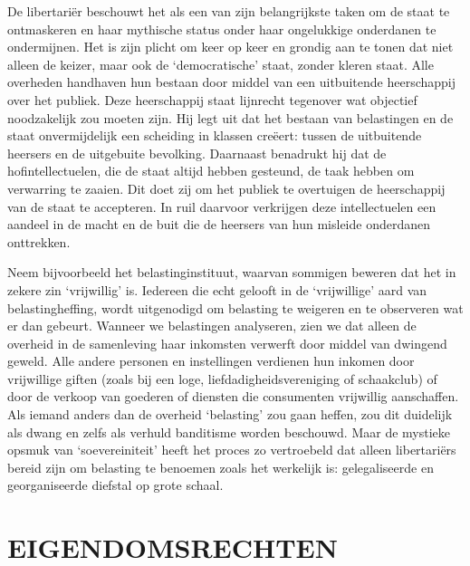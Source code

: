 \documentclass[
  a5paper,
  smalldemyvopaper,10pt,twoside,onecolumn,openright,extrafontsizes,hidelinks]{memoir}
\begin{document}
De libertariër beschouwt het als een van zijn belangrijkste taken om de
staat te ontmaskeren en haar mythische status onder haar ongelukkige
onderdanen te ondermijnen. Het is zijn plicht om keer op keer en grondig
aan te tonen dat niet alleen de keizer, maar ook de `democratische'
staat, zonder kleren staat. Alle overheden handhaven hun bestaan door
middel van een uitbuitende heerschappij over het publiek. Deze
heerschappij staat lijnrecht tegenover wat objectief noodzakelijk zou
moeten zijn. Hij legt uit dat het bestaan van belastingen en de staat
onvermijdelijk een scheiding in klassen creëert: tussen de uitbuitende
heersers en de uitgebuite bevolking. Daarnaast benadrukt hij dat de
hofintellectuelen, die de staat altijd hebben gesteund, de taak hebben
om verwarring te zaaien. Dit doet zij om het publiek te overtuigen de
heerschappij van de staat te accepteren. In ruil daarvoor verkrijgen
deze intellectuelen een aandeel in de macht en de buit die de heersers
van hun misleide onderdanen onttrekken.

Neem bijvoorbeeld het belastinginstituut, waarvan sommigen beweren dat
het in zekere zin `vrijwillig' is. Iedereen die echt gelooft in de
`vrijwillige' aard van belastingheffing, wordt uitgenodigd om belasting
te weigeren en te observeren wat er dan gebeurt. Wanneer we belastingen
analyseren, zien we dat alleen de overheid in de samenleving haar
inkomsten verwerft door middel van dwingend geweld. Alle andere personen
en instellingen verdienen hun inkomen door vrijwillige giften (zoals bij
een loge, liefdadigheidsvereniging of schaakclub) of door de verkoop van
goederen of diensten die consumenten vrijwillig aanschaffen. Als iemand
anders dan de overheid `belasting' zou gaan heffen, zou dit duidelijk
als dwang en zelfs als verhuld banditisme worden beschouwd. Maar de
mystieke opsmuk van `soevereiniteit' heeft het proces zo vertroebeld dat
alleen libertariërs bereid zijn om belasting te benoemen zoals het
werkelijk is: gelegaliseerde en georganiseerde diefstal op grote schaal.

\section{EIGENDOMSRECHTEN}\label{eigendomsrechten}
\end{document}
